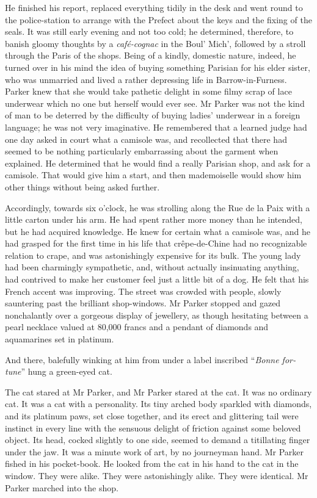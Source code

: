He finished his report, replaced everything tidily in the desk and went round to the police-station to arrange with the Prefect about the keys and the fixing of the seals. It was still early evening and not too cold; he determined, therefore, to banish gloomy thoughts by a \foreignlanguage{french}{\textit{café-cognac}} in the Boul' Mich', followed by a stroll through the Paris of the shops. Being of a kindly, domestic nature, indeed, he turned over in his mind the idea of buying something Parisian for his elder sister, who was unmarried and lived a rather depressing life in Barrow-in-Furness. Parker knew that she would take pathetic delight in some filmy scrap of lace underwear which no one but herself would ever see. Mr Parker was not the kind of man to be deterred by the difficulty of buying ladies' underwear in a foreign language; he was not very imaginative. He remembered that a learned judge had one day asked in court what a camisole was, and recollected that there had seemed to be nothing particularly embarrassing about the garment when explained. He determined that he would find a really Parisian shop, and ask for a camisole. That would give him a start, and then mademoiselle would show him other things without being asked further.

Accordingly, towards six o'clock, he was strolling along the Rue de la Paix with a little carton under his arm. He had spent rather more money than he intended, but he had acquired knowledge. He knew for certain what a camisole was, and he had grasped for the first time in his life that crêpe-de-Chine had no recognizable relation to crape, and was astonishingly expensive for its bulk. The young lady had been charmingly sympathetic, and, without actually insinuating anything, had contrived to make her customer feel just a little bit of a dog. He felt that his French accent was improving. The street was crowded with people, slowly sauntering past the brilliant shop-windows. Mr Parker stopped and gazed nonchalantly over a gorgeous display of jewellery, as though hesitating between a pearl necklace valued at 80,000 francs and a pendant of diamonds and aquamarines set in platinum.

And there, balefully winking at him from under a label inscribed \foreignquote{french}{\textit{Bonne fortune}} hung a green-eyed cat.

The cat stared at Mr Parker, and Mr Parker stared at the cat. It was no ordinary cat. It was a cat with a personality. Its tiny arched body sparkled with diamonds, and its platinum paws, set close together, and its erect and glittering tail were instinct in every line with the sensuous delight of friction against some beloved object. Its head, cocked slightly to one side, seemed to demand a titillating finger under the jaw. It was a minute work of art, by no journeyman hand. Mr  Parker fished in his pocket-book. He looked from the cat in his hand to the cat in the window. They were alike. They were astonishingly alike.  They were identical. Mr Parker marched into the shop.

